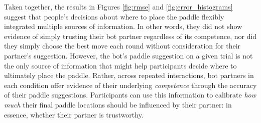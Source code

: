 \documentclass[10pt,letterpaper]{article}
\begin{document}
Taken together, the results in Figures \ref{fig:rmse} and \ref{fig:error_histograms} suggest that people's decisions about where to place the paddle flexibly integrated multiple sources of information. In other words, they did not show evidence of simply trusting their bot partner regardless of its competence, nor did they simply choose the best move each round without consideration for their partner's suggestion. However, the bot's paddle suggestion on a given trial is not the only source of information that might help participants decide where to ultimately place the paddle. Rather, across repeated interactions, bot partners in each condition offer evidence of their underlying \textit{competence} through the accuracy of their paddle suggestions. Participants can use this information to calibrate \textit{how much} their final paddle locations should be influenced by their partner: in essence, whether their partner is trustworthy. 


\end{document}

